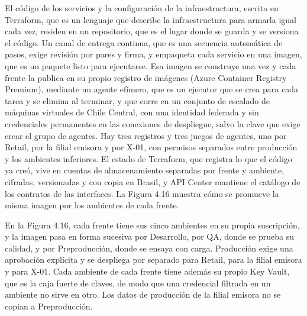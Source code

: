 \documentclass[11pt]{article}
\begin{document}
El código de los servicios y la configuración de la infraestructura, escrita en Terraform, que es un lenguaje que describe la infraestructura para armarla igual cada vez, residen en un repositorio, que es el lugar donde se guarda y se versiona el código. Un canal de entrega continua, que es una secuencia automática de pasos, exige revisión por pares y firma, y empaqueta cada servicio en una imagen, que es un paquete listo para ejecutarse. Esa imagen se construye una vez y cada frente la publica en su propio registro de imágenes (Azure Container Registry Premium), mediante un agente efímero, que es un ejecutor que se crea para cada tarea y se elimina al terminar, y que corre en un conjunto de escalado de máquinas virtuales de Chile Central, con una identidad federada y sin credenciales permanentes en las conexiones de despliegue, salvo la clave que exige crear el grupo de agentes. Hay tres registros y tres juegos de agentes, uno por Retail, por la filial emisora y por X-01, con permisos separados entre producción y los ambientes inferiores. El estado de Terraform, que registra lo que el código ya creó, vive en cuentas de almacenamiento separadas por frente y ambiente, cifradas, versionadas y con copia en Brasil, y API Center mantiene el catálogo de los contratos de las interfaces. La Figura 4.16 muestra cómo se promueve la misma imagen por los ambientes de cada frente.


En la Figura 4.16, cada frente tiene sus cinco ambientes en su propia suscripción, y la imagen pasa en forma sucesiva por Desarrollo, por QA, donde se prueba su calidad, y por Preproducción, donde se ensaya con carga. Producción exige una aprobación explícita y se despliega por separado para Retail, para la filial emisora y para X-01. Cada ambiente de cada frente tiene además su propio Key Vault, que es la caja fuerte de claves, de modo que una credencial filtrada en un ambiente no sirve en otro. Los datos de producción de la filial emisora no se copian a Preproducción.
\end{document}
